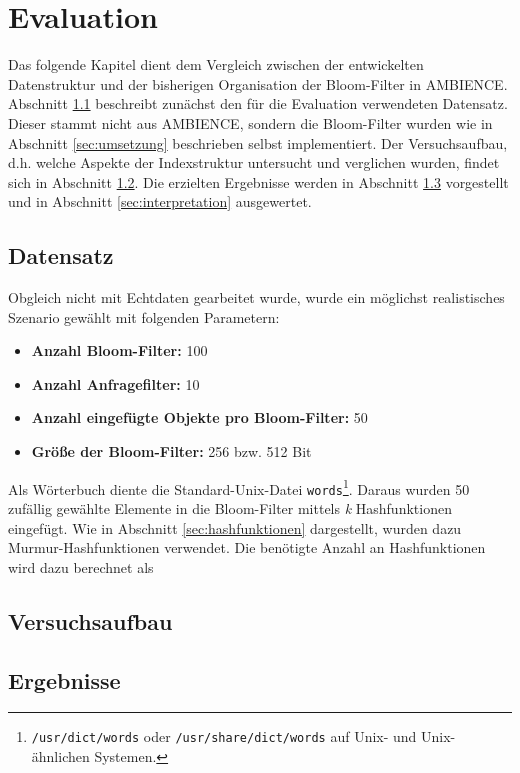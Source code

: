 \chapter{Evaluation}\label{ch:evaluation}
Das folgende Kapitel dient dem Vergleich zwischen der entwickelten Datenstruktur und der bisherigen Organisation der Bloom-Filter in AMBIENCE. Abschnitt \ref{sec:datensatz} beschreibt zunächst den für die Evaluation verwendeten Datensatz. Dieser stammt nicht aus AMBIENCE, sondern die Bloom-Filter wurden wie in Abschnitt \ref{sec:umsetzung} beschrieben selbst implementiert. Der Versuchsaufbau, d.h. welche Aspekte der Indexstruktur untersucht und verglichen wurden, findet sich in Abschnitt \ref{sec:versuchsaufbau}. Die erzielten Ergebnisse werden in Abschnitt \ref{sec:ergebnisse} vorgestellt und in Abschnitt \ref{sec:interpretation} ausgewertet. 
\section{Datensatz}\label{sec:datensatz}
Obgleich nicht mit Echtdaten gearbeitet wurde, wurde ein möglichst realistisches Szenario gewählt mit folgenden Parametern: 
\begin{itemize}
	\item \textbf{Anzahl Bloom-Filter:} 100
	\item \textbf{Anzahl Anfragefilter:} 10
	\item \textbf{Anzahl eingefügte Objekte pro Bloom-Filter:} 50 
	\item \textbf{Größe der Bloom-Filter:} 256 bzw. 512 Bit
\end{itemize} 
Als Wörterbuch diente die Standard-Unix-Datei \texttt{words}\footnote{\texttt{/usr/dict/words} oder \texttt{/usr/share/dict/words} auf Unix- und Unix-ähnlichen Systemen.}. Daraus wurden 50 zufällig gewählte Elemente in die Bloom-Filter mittels \textit{k} Hashfunktionen eingefügt. Wie in Abschnitt \ref{sec:hashfunktionen} dargestellt, wurden dazu Murmur-Hashfunktionen verwendet. Die benötigte Anzahl an Hashfunktionen wird dazu berechnet als 
\section{Versuchsaufbau}\label{sec:versuchsaufbau}
\section{Ergebnisse}\label{sec:ergebnisse}
